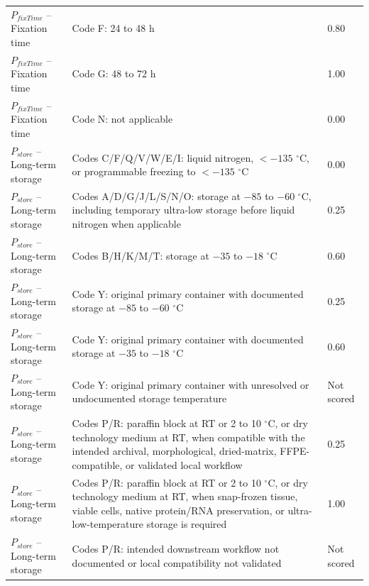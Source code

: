 \documentclass[preprint,12pt]{elsarticle}
\begin{document}
\begin{longtable}{@{}p{3.0cm}p{8.2cm}p{1.2cm}@{}}
\(P_{fixTime}\) -- Fixation time
& Code F: 24 to 48 h
& 0.80 \\

\(P_{fixTime}\) -- Fixation time
& Code G: 48 to 72 h
& 1.00 \\

\(P_{fixTime}\) -- Fixation time
& Code N: not applicable
& 0.00 \\

\midrule

\(P_{store}\) -- Long-term storage
& Codes C/F/Q/V/W/E/I: liquid nitrogen, \(<-135\) \(^{\circ}\)C, or programmable freezing to \(<-135\) \(^{\circ}\)C
& 0.00 \\

\(P_{store}\) -- Long-term storage
& Codes A/D/G/J/L/S/N/O: storage at \(-85\) to \(-60\) \(^{\circ}\)C, including temporary ultra-low storage before liquid nitrogen when applicable
& 0.25 \\

\(P_{store}\) -- Long-term storage
& Codes B/H/K/M/T: storage at \(-35\) to \(-18\) \(^{\circ}\)C
& 0.60 \\

\(P_{store}\) -- Long-term storage
& Code Y: original primary container with documented storage at \(-85\) to \(-60\) \(^{\circ}\)C
& 0.25 \\

\(P_{store}\) -- Long-term storage
& Code Y: original primary container with documented storage at \(-35\) to \(-18\) \(^{\circ}\)C
& 0.60 \\

\(P_{store}\) -- Long-term storage
& Code Y: original primary container with unresolved or undocumented storage temperature
& Not scored \\

\(P_{store}\) -- Long-term storage
& Codes P/R: paraffin block at RT or 2 to 10 \(^{\circ}\)C, or dry technology medium at RT, when compatible with the intended archival, morphological, dried-matrix, FFPE-compatible, or validated local workflow
& 0.25 \\

\(P_{store}\) -- Long-term storage
& Codes P/R: paraffin block at RT or 2 to 10 \(^{\circ}\)C, or dry technology medium at RT, when snap-frozen tissue, viable cells, native protein/RNA preservation, or ultra-low-temperature storage is required
& 1.00 \\

\(P_{store}\) -- Long-term storage
& Codes P/R: intended downstream workflow not documented or local compatibility not validated
& Not scored \\


\end{longtable}
\end{document}

